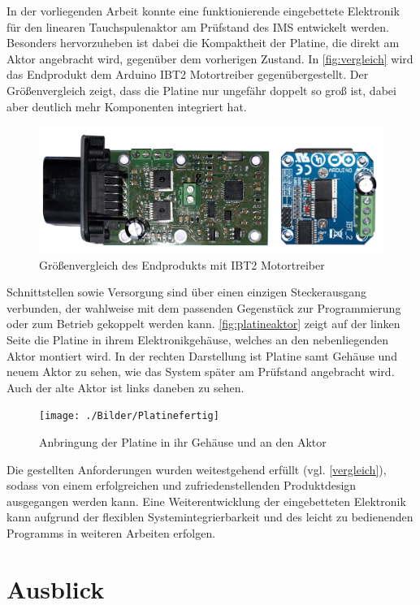 In der vorliegenden Arbeit konnte eine funktionierende eingebettete Elektronik für den linearen Tauchspulenaktor am Prüfstand des IMS entwickelt werden. Besonders hervorzuheben ist dabei die Kompaktheit der Platine, die direkt am Aktor angebracht wird, gegenüber dem vorherigen Zustand. In \autoref{fig:vergleich} wird das Endprodukt dem Arduino IBT2 Motortreiber gegenübergestellt. Der Größenvergleich zeigt, dass die Platine nur ungefähr doppelt so groß ist, dabei aber deutlich mehr Komponenten integriert hat.
\begin{figure}[H]%
\centering
\includegraphics[width=0.6\columnwidth]{./Bilder/vergleichplat}%
\caption{Größenvergleich des Endprodukts mit IBT2 Motortreiber}%
\label{fig:vergleich}%
\end{figure}\noindent
Schnittstellen sowie Versorgung sind über einen einzigen Steckerausgang verbunden, der wahlweise mit dem passenden Gegenstück zur Programmierung oder zum Betrieb gekoppelt werden kann. 
\autoref{fig:platineaktor} zeigt auf der linken Seite die Platine in ihrem Elektronikgehäuse, welches an den nebenliegenden Aktor montiert wird. In der rechten Darstellung ist Platine samt Gehäuse und neuem Aktor zu sehen, wie das System später am Prüfstand angebracht wird. Auch der alte Aktor ist links daneben zu sehen.
\begin{figure}[H]
\centering
\texttt{[image: ./Bilder/Platinefertig]}
\caption{Anbringung der Platine in ihr Gehäuse und an den Aktor}
\label{fig:platineaktor}
\end{figure}\noindent
Die gestellten Anforderungen wurden weitestgehend erfüllt (vgl. \autoref{vergleich}), sodass von einem erfolgreichen und zufriedenstellenden Produktdesign ausgegangen werden kann. Eine Weiterentwicklung der eingebetteten Elektronik kann aufgrund der flexiblen Systemintegrierbarkeit und des leicht zu bedienenden Programms in weiteren Arbeiten erfolgen. 

\section{Ausblick} 

